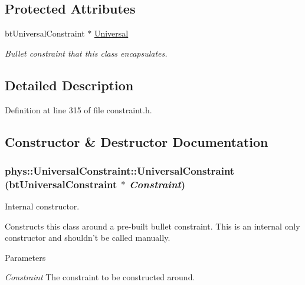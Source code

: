 \subsection*{Protected Attributes}
\begin{DoxyCompactItemize}
\item 
\hypertarget{classphys_1_1UniversalConstraint_ac05eed2dae4f659652d5a5ecd88bacf8}{
btUniversalConstraint $\ast$ \hyperlink{classphys_1_1UniversalConstraint_ac05eed2dae4f659652d5a5ecd88bacf8}{Universal}}
\label{d0/d09/classphys_1_1UniversalConstraint_ac05eed2dae4f659652d5a5ecd88bacf8}

\begin{DoxyCompactList}\small\item\em Bullet constraint that this class encapsulates. \item\end{DoxyCompactList}\end{DoxyCompactItemize}


\subsection{Detailed Description}


Definition at line 315 of file constraint.h.



\subsection{Constructor \& Destructor Documentation}
\hypertarget{classphys_1_1UniversalConstraint_af4d0828590b7fb242f601a171aa5db5f}{
\subsubsection[{UniversalConstraint}]{\setlength{\rightskip}{0pt plus 5cm}phys::UniversalConstraint::UniversalConstraint (btUniversalConstraint $\ast$ {\em Constraint})}}
\label{d0/d09/classphys_1_1UniversalConstraint_af4d0828590b7fb242f601a171aa5db5f}


Internal constructor. 

Constructs this class around a pre-\/built bullet constraint. This is an internal only constructor and shouldn't be called manually. 
\begin{DoxyParams}{Parameters}
\item[{\em Constraint}]The constraint to be constructed around. \end{DoxyParams}


